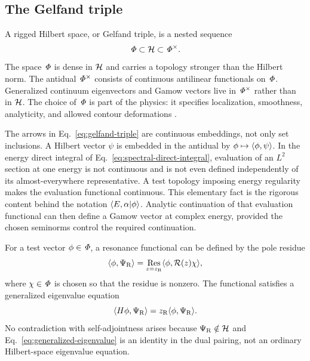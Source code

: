 \subsection{The Gelfand triple}
\label{subsec:gelfand-triple}

A rigged Hilbert space, or Gelfand triple, is a nested sequence
\begin{equation}
  \mathit{\Phi}\subset\mathcal{H}\subset\mathit{\Phi}^{\times} .
  \label{eq:gelfand-triple}
\end{equation}
The space $\mathit{\Phi}$ is dense in $\mathcal{H}$ and carries a topology stronger than
the Hilbert norm.  The antidual $\mathit{\Phi}^{\times}$ consists of continuous
antilinear functionals on $\mathit{\Phi}$.  Generalized continuum eigenvectors and
Gamow vectors live in $\mathit{\Phi}^{\times}$ rather than in $\mathcal{H}$.  The choice
of $\mathit{\Phi}$ is part of the physics: it specifies localization, smoothness,
analyticity, and allowed contour deformations
\cite{DelaMadrid:2001wwa,DelaMadrid:2001dln,DelaMadrid:2002cz,Rafael:2012}.

The arrows in Eq.~\eqref{eq:gelfand-triple} are continuous embeddings, not
only set inclusions.  A Hilbert vector $\psi$ is embedded in the antidual by
$\phi\mapsto\langle \phi,\psi\rangle$.  In the energy direct integral of
Eq.~\eqref{eq:spectral-direct-integral}, evaluation of an $L^2$ section at one
energy is not continuous and is not even defined independently of its
almost-everywhere representative.  A test topology imposing energy
regularity makes the evaluation functional continuous.  This elementary fact
is the rigorous content behind the notation $\langle E,\alpha|\phi \rangle$.
Analytic continuation of that evaluation functional can then define a Gamow
vector at complex energy, provided the chosen seminorms control the required
continuation.

For a test vector $\phi\in\mathit{\Phi}$, a resonance functional can be defined by
the pole residue
\begin{equation}
  \langle \phi,\Psi_{\mathrm R}\rangle
  =\operatorname*{Res}_{z=z_{\mathrm R}}
  \langle \phi,\mathcal{R}(z)\chi\rangle ,
  \label{eq:gamow-functional}
\end{equation}
where $\chi\in\mathit{\Phi}$ is chosen so that the residue is nonzero.  The
functional satisfies a generalized eigenvalue equation
\begin{equation}
  \langle H\phi,\Psi_{\mathrm R}\rangle
  =z_{\mathrm R}\langle \phi,\Psi_{\mathrm R}\rangle .
  \label{eq:generalized-eigenvalue}
\end{equation}
No contradiction with self-adjointness arises because
$\Psi_{\mathrm R}\notin\mathcal{H}$ and Eq.~\eqref{eq:generalized-eigenvalue} is an
identity in the dual pairing, not an ordinary Hilbert-space eigenvalue
equation.

